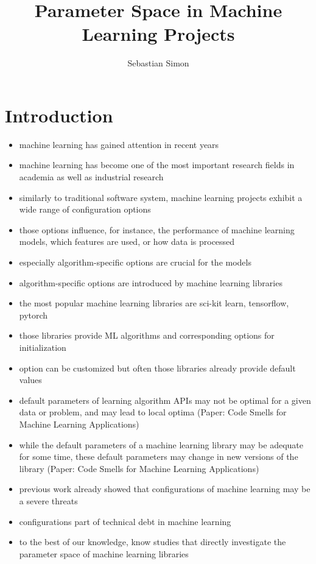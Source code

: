 \documentclass[sigconf,review,anonymous]{acmart}
\title{Parameter Space in Machine Learning Projects}
\author{Sebastian Simon}
\affiliation{%
    \institution{Leipzig University}
    \country{Germany}
}
\begin{document}
\maketitle

\section{Introduction}\label{sec:intro}
\begin{itemize}
    \item machine learning has gained attention in recent years
    \item machine learning has become one of the most important research fields in academia as well as industrial research
    \item similarly to traditional software system, machine learning projects exhibit a wide range of configuration options
    \item those options influence, for instance, the performance of machine learning models, which features are used, or how data is processed
    \item especially algorithm-specific options are crucial for the models
    \item algorithm-specific options are introduced by machine learning libraries 
    \item the most popular machine learning libraries are sci-kit learn, tensorflow, pytorch
    \item those libraries provide ML algorithms and corresponding options for initialization
    \item option can be customized but often those libraries already provide default values
    \item default parameters of learning algorithm APIs may not be optimal for a given data or problem, and may lead to local optima (Paper: Code Smells for Machine Learning Applications)
    \item while the default parameters of a machine learning library may be adequate for some time, these default parameters may change in new versions of the library (Paper: Code Smells for Machine Learning Applications)
\end{itemize}

\begin{itemize}
    \item previous work already showed that configurations of machine learning may be a severe threats
    \item configurations part of technical debt in machine learning
    \item to the best of our knowledge, know studies that directly investigate the parameter space of machine learning libraries
\end{itemize}
\end{document}
